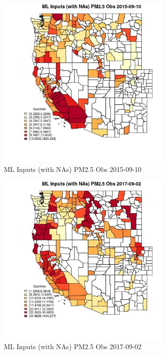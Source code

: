 \begin{figure} 
\centering  
\includegraphics[width=0.77\textwidth]{Code_Outputs/Report_ML_input_PM25_Step4_part_e_de_duplicated_aveswNAs_CountyPM25_ObsMean2015-09-10_2015-09-10.jpg} 
\caption{\label{fig:Report_ML_input_PM25_Step4_part_e_de_duplicated_aveswNAsCountyPM25_ObsMean2015-09-10_2015-09-10}ML Inputs (with NAs) PM2.5 Obs 2015-09-10} 
\end{figure} 
 

\begin{figure} 
\centering  
\includegraphics[width=0.77\textwidth]{Code_Outputs/Report_ML_input_PM25_Step4_part_e_de_duplicated_aveswNAs_CountyPM25_ObsMean2017-09-02_2017-09-02.jpg} 
\caption{\label{fig:Report_ML_input_PM25_Step4_part_e_de_duplicated_aveswNAsCountyPM25_ObsMean2017-09-02_2017-09-02}ML Inputs (with NAs) PM2.5 Obs 2017-09-02} 
\end{figure} 
 

